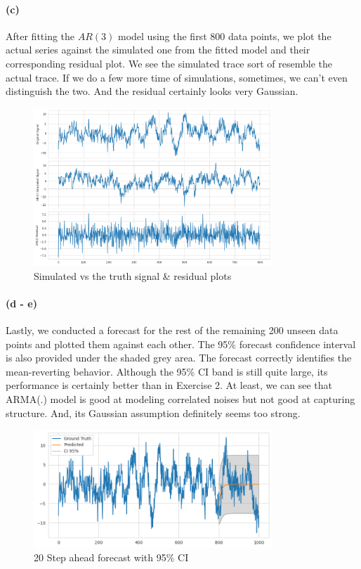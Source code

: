 \documentclass[11pt, letterpaper]{article}
\begin{document}
\paragraph{(c)} After fitting the $AR(3)$ model using the first 800 data points, we plot the actual series against the simulated one from the fitted model and their corresponding residual plot. We see the simulated trace sort of resemble the actual trace. If we do a few more time of simulations, sometimes, we can't even distinguish the two. And the residual certainly looks very Gaussian.
\begin{figure}[!h]
  \centering
  \includegraphics[width=0.8\textwidth]{plot5.png}
  \captionsetup{justification=centering}
  \caption{Simulated vs the truth signal & residual plots}
\end{figure}

\paragraph{(d - e)} Lastly, we conducted a forecast for the rest of the remaining 200 unseen data points and plotted them against each other. The 95\% forecast confidence interval is also provided under the shaded grey area. The forecast correctly identifies the mean-reverting behavior. Although the 95\% CI band is still quite large, its performance is certainly better than in Exercise 2. At least, we can see that ARMA(.) model is good at modeling correlated noises but not good at capturing structure. And, its Gaussian assumption definitely seems too strong.

\begin{figure}[!h]
  \centering
  \includegraphics[width=0.8\textwidth]{plot6.png}
  \captionsetup{justification=centering}
  \caption{20 Step ahead forecast with 95\% CI}
\end{figure}
\end{document}
